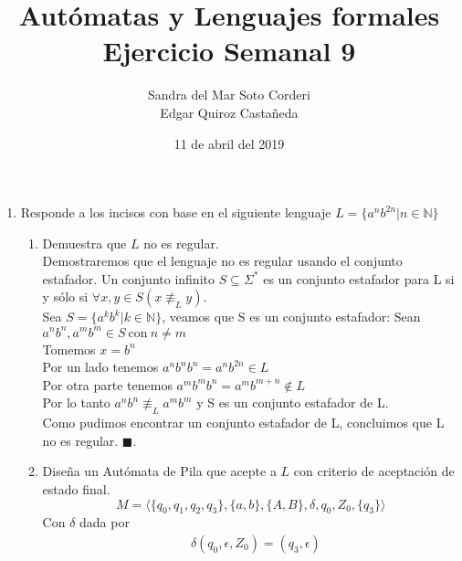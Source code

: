 \documentclass{article}
\begin{document}
    \title{
        Autómatas y Lenguajes formales \\
        Ejercicio Semanal 9
    }

    \author{
        Sandra del Mar Soto Corderi \\
        Edgar Quiroz Castañeda
    }

    \date{
        11 de abril del 2019
    }
    
    \maketitle

    \begin{enumerate}
        \item {
        Responde a los incisos con base en el siguiente lenguaje $L = 
        \{a^nb^{2n} | n \in \mathbb{N}\}$
        \begin{enumerate}
        	\item {
        	Demuestra que $L$ no es regular.\\
            Demostraremos que el lenguaje no es regular usando el conjunto 
            estafador.
            Un conjunto infinito $S \subseteq \Sigma^*$ es un conjunto estafador
            para L si y sólo si $\forall x,y \in S (x \not\equiv_L y)$.\\
            Sea $S = \{ a^kb^k | k \in \mathbb{N}\}$, veamos que S es un 
            conjunto estafador: Sean $a^nb^n , a^mb^m \in S \ \text{con} \ n 
            \neq m$\\
        	Tomemos $x = b^n$\\
        	Por un lado tenemos $ a^nb^nb^n = a^nb^{2n} \in L$\\
        	Por otra parte tenemos $a^mb^mb^n = a^mb^{m + n} \not \in L$\\
            Por lo tanto $a^nb^n \not\equiv_L a^mb^m$ y S es un conjunto 
            estafador de L.\\
            Como pudimos encontrar un conjunto estafador de L, concluimos que 
            L no es regular. $\blacksquare$.
        	}
        	\item{
            Diseña un Autómata de Pila que acepte a $L$ con criterio de 
            aceptación de estado final.
            \[M = \langle \{q_{0}, q_{1}, q_{2}, q_{3}\}, \{a, b\}, \{A, B\},
            \delta, q_{0}, Z_{0}, \{q_{3}\}\rangle\]
            Con $\delta$ dada por
            \begin{align*}
                &\delta(q_{0}, \epsilon, Z_{0}) = (q_{3}, \epsilon) \\

\end{align*}}
\end{enumerate}}
\end{enumerate}
\end{document}
